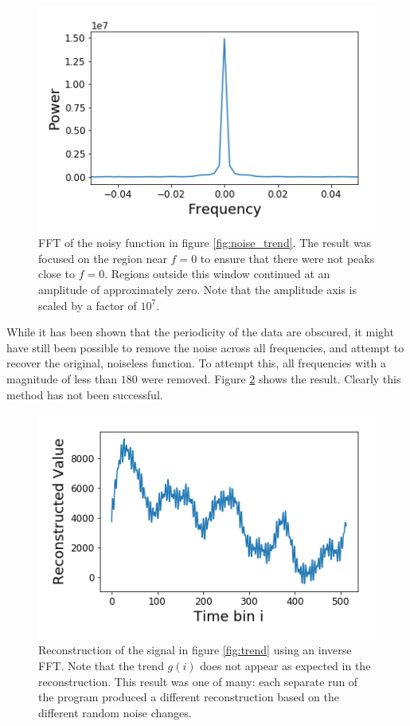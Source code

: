 \documentclass[twocolumn]{article}
\begin{document}
\begin{figure}
\centering
\includegraphics[width=\linewidth]{trend_fft}
\caption{FFT of the noisy function in figure \ref{fig:noise_trend}. The result was focused on the region near $f=0$ to ensure that there were not peaks close to $f=0$. Regions outside this window continued at an amplitude of approximately zero. Note that the amplitude axis is scaled by a factor of $10^{7}$.}
\label{fig:trend_fft}
\end{figure}

While it has been shown that the periodicity of the data are obscured, it might have still been possible to remove the noise across all frequencies, and attempt to recover the original, noiseless function. To attempt this, all frequencies with a magnitude of less than $180$ were removed. Figure \ref{fig:Reconstruction} shows the result. Clearly this method has not been successful. 

\begin{figure}
\centering
\includegraphics[width=\linewidth]{Reconstruction}
\caption{Reconstruction of the signal in figure \ref{fig:trend} using an inverse FFT. Note that the trend $g(i)$ does not appear as expected in the reconstruction. This result was one of many: each separate run of the program produced a different reconstruction based on the different random noise changes.}
\label{fig:Reconstruction}
\end{figure}
\end{document}
